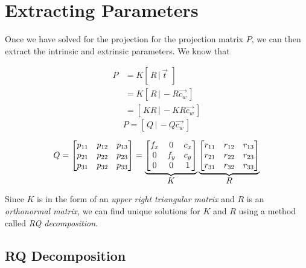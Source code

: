 \section{Extracting Parameters}

Once we have solved for the projection for the projection matrix $P$, we can then extract the intrinsic and extrinsic parameters. We know that

\begin{align}
    P & = K\left[\,R \,\vert\, \vec{t}\:\,\right]       \nonumber \\
      & = K\left[\,R \,\vert\,-R\vec{c_w}\,\right]      \nonumber \\
      & = \left[\,K\!R\,\vert\,-K\!R\vec{c_w}\,\right]
\end{align}
\begin{equation}
    P = \left[\,Q \,\vert\,-Q\vec{c_w}\,\right]
\end{equation}

\begin{equation*}
    Q =
    \begin{bmatrix}
        p_{11} & p_{12} & p_{13} \\
        p_{21} & p_{22} & p_{23} \\
        p_{31} & p_{32} & p_{33}
    \end{bmatrix}
    =
    \underbrace{
        \begin{bmatrix}
            f_x & 0   & c_x \\
            0   & f_y & c_y \\
            0   & 0   & 1
        \end{bmatrix}
    }_{\mathlarger{K}}
    \underbrace{
        \begin{bmatrix}
            r_{11} & r_{12} & r_{13} \\
            r_{21} & r_{22} & r_{23} \\
            r_{31} & r_{32} & r_{33} \\
        \end{bmatrix}
    }_{\mathlarger{R}}
\end{equation*}

Since $K$ is in the form of an \emph{upper right triangular matrix} and $R$ is an \emph{orthonormal matrix}, we can find unique solutions for $K$ and $R$ using a method called \emph{RQ decomposition}.

\subsection{RQ Decomposition}


